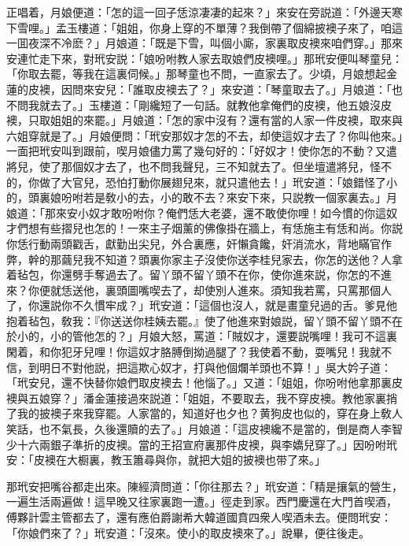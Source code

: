 正唱着，月娘便道：「怎的這一回子恁涼凄凄的起來？」來安在旁説道：「外邊天寒下雪哩。」孟玉樓道：「姐姐，你身上穿的不單薄？我倒帶了個綿披襖子來了，咱這一囬夜深不冷麽？」月娘道：「既是下雪，叫個小廝，家裏取皮襖來咱們穿。」那來安連忙走下來，對玳安説：「娘吩咐教人家去取娘們皮襖哩。」那玳安便叫琴童兒：「你取去罷，等我在這裏伺候。」那琴童也不問，一直家去了。少頃，月娘想起金蓮的皮襖，因問來安兒：「誰取皮襖去了？」來安道：「琴童取去了。」月娘道：「也不問我就去了。」玉樓道：「剛纔短了一句話。就教他拿俺們的皮襖，他五娘沒皮襖，只取姐姐的來罷。」月娘道：「怎的家中沒有？還有當的人家一件皮襖，取來與六姐穿就是了。」月娘便問：「玳安那奴才怎的不去，却使這奴才去了？你叫他來。」一面把玳安叫到跟前，喫月娘儘力罵了幾句好的：「好奴才！使你怎的不動？又遣將兒，使了那個奴才去了，也不問我聲兒，三不知就去了。但坐壇遣將兒，怪不的，你做了大官兒，恐怕打動你展翅兒來，就只遣他去！」玳安道：「娘錯怪了小的，頭裏娘吩咐若是敎小的去，小的敢不去？來安下來，只説教一個家裏去。」月娘道：「那來安小奴才敢吩咐你？俺們恁大老婆，還不敢使你哩！如今慣的你這奴才們想有些摺兒也怎的！一來主子烟薰的佛像掛在牆上，有恁施主有恁和尚。你説你恁行動兩頭戳舌，獻勤出尖兒，外合裏應，奸懶貪饞，奸消流水，背地瞞官作弊，幹的那繭兒我不知道？頭裏你家主子沒使你送李桂兒家去，你怎的送他？人拿着毡包，你還劈手奪過去了。留丫頭不留丫頭不在你，使你進來説，你怎的不進來？你便就恁送他，裏頭圖嘴喫去了，却使別人進來。須知我若罵，只罵那個人了，你還説你不久慣牢成？」玳安道：「這個也沒人，就是畫童兒過的舌。爹見他抱着毡包，敎我：『你送送你桂姨去罷。』使了他進來對娘説，留丫頭不留丫頭不在於小的，小的管他怎的？」月娘大怒，罵道：「賊奴才，還要説嘴哩！我可不這裏閑着，和你犯牙兒哩！你這奴才胳膊倒拗過腿了？我使着不動，耍嘴兒！我就不信，到明日不對他説，把這欺心奴才，打與他個爛羊頭也不算！」吳大妗子道：「玳安兒，還不快替你娘們取皮襖去！他惱了。」又道：「姐姐，你吩咐他拿那裏皮襖與五娘穿？」潘金蓮接過來説道：「姐姐，不要取去，我不穿皮襖。教他家裏捎了我的披襖子來我穿罷。人家當的，知道好也夕也？黄狗皮也似的，穿在身上敎人笑話，也不氣長，久後還贖的去了。」月娘道：「這皮襖纔不是當的，倒是商人李智少十六兩銀子準折的皮襖。當的王招宣府裏那件皮襖，與李嬌兒穿了。」因吩咐玳安：「皮襖在大橱裏，教玉簫尋與你，就把大姐的披襖也带了來。」

那玳安把嘴谷都走出來。陳經濟問道：「你往那去？」玳安道：「精是攘氣的營生，一遍生活兩遍做！這早晚又往家裏跑一遭。」徑走到家。西門慶還在大門首喫酒，傅夥計雲主管都去了，還有應伯爵謝希大韓道國賁四衆人喫酒未去。便問玳安：「你娘們來了？」玳安道：「沒來。使小的取皮襖來了。」說畢，便往後走。

